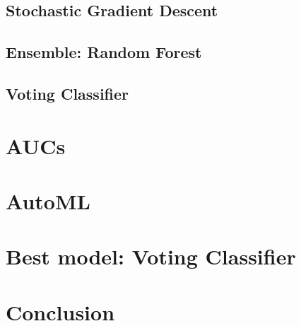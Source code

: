 \documentclass[titlepage, 11pt]{article}
\begin{document}
\subsection{Stochastic Gradient Descent}


\subsection{Ensemble: Random Forest}


\subsection{Voting Classifier}


\section{AUCs}


\section{AutoML}


\section{Best model: Voting Classifier}


\section{Conclusion}

\end{document}
